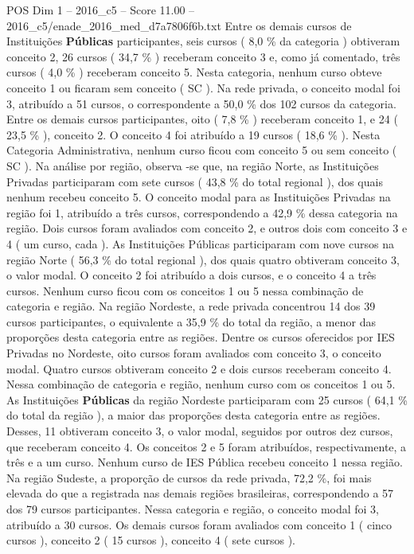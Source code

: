 \begin{textsample}{POS Dim 1 – 2016\_c5 – Score 11.00 – 2016\_c5/enade\_2016\_med\_d7a7806f6b.txt}
Entre os demais cursos de Instituições \textbf{Públicas} participantes, seis cursos ( 8,0 \% da categoria ) obtiveram conceito 2, 26 cursos ( 34,7 \% ) receberam conceito 3 e, como já comentado, três cursos ( 4,0 \% ) receberam conceito 5.
Nesta categoria, nenhum curso obteve conceito 1 ou ficaram sem conceito ( SC ).
Na rede privada, o conceito modal foi 3, atribuído a 51 cursos, o correspondente a 50,0 \% dos 102 cursos da categoria.
Entre os demais cursos participantes, oito ( 7,8 \% ) receberam conceito 1, e 24 ( 23,5 \% ), conceito 2.
O conceito 4 foi atribuído a 19 cursos ( 18,6 \% ).
Nesta Categoria Administrativa, nenhum curso ficou com conceito 5 ou sem conceito ( SC ).
Na análise por região, observa -se que, na região Norte, as Instituições Privadas participaram com sete cursos ( 43,8 \% do total regional ), dos quais nenhum recebeu conceito 5.
O conceito modal para as Instituições Privadas na região foi 1, atribuído a três cursos, correspondendo a 42,9 \% dessa categoria na região.
Dois cursos foram avaliados com conceito 2, e outros dois com conceito 3 e 4 ( um curso, cada ).
As Instituições Públicas participaram com nove cursos na região Norte ( 56,3 \% do total regional ), dos quais quatro obtiveram conceito 3, o valor modal.
O conceito 2 foi atribuído a dois cursos, e o conceito 4 a três cursos.
Nenhum curso ficou com os conceitos 1 ou 5 nessa combinação de categoria e região.
Na região Nordeste, a rede privada concentrou 14 dos 39 cursos participantes, o equivalente a 35,9 \% do total da região, a menor das proporções desta categoria entre as regiões.
Dentre os cursos oferecidos por IES Privadas no Nordeste, oito cursos foram avaliados com conceito 3, o conceito modal.
Quatro cursos obtiveram conceito 2 e dois cursos receberam conceito 4.
Nessa combinação de categoria e região, nenhum curso com os conceitos 1 ou 5.
As Instituições \textbf{Públicas} da região Nordeste participaram com 25 cursos ( 64,1 \% do total da região ), a maior das proporções desta categoria entre as regiões.
Desses, 11 obtiveram conceito 3, o valor modal, seguidos por outros dez cursos, que receberam conceito 4.
Os conceitos 2 e 5 foram atribuídos, respectivamente, a três e a um curso.
Nenhum curso de IES Pública recebeu conceito 1 nessa região.
Na região Sudeste, a proporção de cursos da rede privada, 72,2 \%, foi mais elevada do que a registrada nas demais regiões brasileiras, correspondendo a 57 dos 79 cursos participantes.
Nessa categoria e região, o conceito modal foi 3, atribuído a 30 cursos.
Os demais cursos foram avaliados com conceito 1 ( cinco cursos ), conceito 2 ( 15 cursos ), conceito 4 ( sete cursos ).

\end{textsample}
